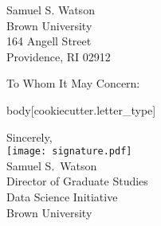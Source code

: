 \documentclass[11pt]{brownletter}
\date{\today}
\begin{document}
\begin{letter}{Samuel S. Watson \\
               Brown University \\
               164 Angell Street \\
               Providence, RI 02912}

\opening{To Whom It May Concern:}

{{ body[cookiecutter.letter_type] }}

\closing{Sincerely, \\
\texttt{[image: signature.pdf]} \\
Samuel S.\ Watson \\
Director of Graduate Studies \\
Data Science Initiative \\
Brown University}

\end{letter}
\end{document}
